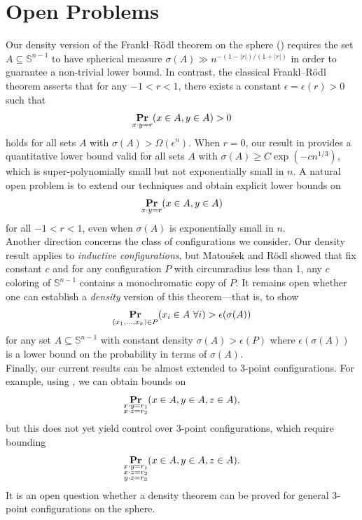 \documentclass[11pt]{article}
\renewcommand{\Pr}{\mathop{\bf Pr\/}}
\newcommand{\sn}{{\mathbb{S}^{n-1} }}
\begin{document}
\section{Open Problems}

Our density version of the Frankl–Rödl theorem on the sphere () requires the set $A \subseteq \mathbb{S}^{n-1}$ to have spherical measure $\sigma(A) \gg n^{-(1-|r|)/(1+|r|)}$ in order to guarantee a non-trivial lower bound. In contrast, the classical Frankl–Rödl theorem asserts that for any $-1 < r < 1$, there exists a constant $\epsilon = \epsilon(r) > 0$ such that
$$
\Pr_{x \cdot y = r}(x \in A, y \in A) > 0
$$
holds for all sets $A$ with $\sigma(A) > \Omega(\epsilon^n)$. When $r = 0$, our result in  provides a quantitative lower bound valid for all sets $A$ with $\sigma(A) \geq C\exp(-cn^{1/3})$, which is super-polynomially small but not exponentially small in $n$. A natural open problem is to extend our techniques and obtain explicit lower bounds on
$$
\Pr_{x \cdot y = r}(x \in A, y \in A)
$$
for all $-1 < r < 1$, even when $\sigma(A)$ is exponentially small in $n$.
\\

Another direction concerns the class of configurations we consider. Our density result applies to \textit{inductive configurations}, but Matoušek and Rödl \cite{matouvsek1995ramsey} showed that fix constant $c$ and for any configuration $P$ with circumradius less than 1, any $c$ coloring of $\sn$ contains a monochromatic copy of $P$. It remains open whether one can establish a \textit{density} version of this theorem—that is, to show
$$
\Pr_{(x_1, \ldots, x_k) \in P}(x_i \in A\ \forall i) > \epsilon(\sigma(A))
$$
for any set $A \subseteq \mathbb{S}^{n-1}$ with constant density $\sigma(A) > \epsilon(P)$ where $\epsilon(\sigma(A))$ is a lower bound on the probability in terms of $\sigma(A)$. 
\\

Finally, our current results can be almost extended to 3-point configurations. For example, using , we can obtain bounds on
$$
\Pr_{\substack{x \cdot y = r_1 \\ x \cdot z = r_2}}(x \in A, y \in A, z \in A),
$$
but this does not yet yield control over 3-point configurations, which require bounding
$$
\Pr_{\substack{x \cdot y = r_1 \\ x \cdot z = r_2 \\ y \cdot z = r_3}}(x \in A, y \in A, z \in A).
$$
It is an open question whether a density theorem can be proved for general 3-point configurations on the sphere.




\end{document}
